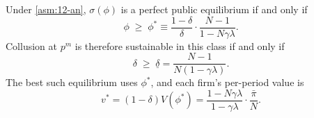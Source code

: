 \begin{proposition}\label{prop:12-an}
Under \cref{asm:12-an}, $\sigma(\phi)$ is a perfect public equilibrium if and only if
\begin{equation}\label{eq:12-an-phi}
\phi \;\ge\; \phi^* \equiv \frac{1 - \delta}{\delta}\cdot\frac{N - 1}{1 - N\gamma\lambda} .
\end{equation}
Collusion at $p^m$ is therefore sustainable in this class if and only if
\begin{equation}\label{eq:12-an-delta}
\delta \;\ge\; \underline\delta = \frac{N - 1}{N(1 - \gamma\lambda)} .
\end{equation}
The best such equilibrium uses $\phi^*$, and each firm's per-period value is
\begin{equation}\label{eq:12-an-value}
v^* = (1 - \delta)V(\phi^*) = \frac{1 - N\gamma\lambda}{1 - \gamma\lambda}\cdot\frac{\bar\pi}{N} .
\end{equation}
\end{proposition}

